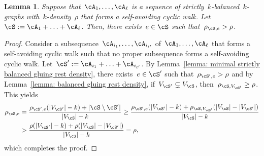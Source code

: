 \documentclass[11pt]{amsart}
\DeclarePairedDelimiter{\abs}{\lvert}{\rvert}
\newtheorem{lemma}[algocf]{Lemma}
\theoremstyle{definition}
\numberwithin{equation}{section}
\begin{document}
	\begin{lemma}\label{lemma: strictly balanced gluing rest density}
		Suppose that~$\cA_1,\ldots,\cA_\ell$ is a sequence of strictly~$k$-balanced~$k$-graphs with~$k$-density~$\rho$ that forms a self-avoiding cyclic walk.
		Let~$\cS:=\cA_1+\ldots+\cA_\ell$.
		Then, there exists~$e\in\cS$ such that~$\rho_{\cS,e}>\rho$.
	\end{lemma}
	\begin{proof}
		Consider a subsequence~$\cA_{i_1},\ldots,\cA_{i_{\ell'}}$ of~$\cA_1,\ldots,\cA_\ell$ that forms a self-avoiding cyclic walk such that no proper subsequence forms a self-avoiding cyclic walk.
		Let~$\cS':=\cA_{i_1}+\ldots+\cA_{i_{\ell'}}$.
		By Lemma~\ref{lemma: minimal strictly balanced gluing rest density}, there exists~$e\in\cS'$ such that~$\rho_{\cS',e}>\rho$ and by Lemma~\ref{lemma: balanced gluing rest density}, if~$V_{\cS'}\subsetneq V_\cS$, then~$\rho_{\cS,V_{\cS'}}\geq\rho$.
		This yields
		\begin{equation*}
			\begin{aligned}
				\rho_{\cS,e}
				&=\frac{ \rho_{\cS',e}(\abs{ V_{\cS'} }-k)+\abs{\cS\setminus\cS'} }{\abs{V_{\cS}}-k}
				\geq \frac{ \rho_{\cS',e}(\abs{ V_{\cS'} }-k)+\rho_{\cS,V_{\cS'}}( \abs{V_{\cS}}-\abs{V_{\cS'}} ) }{\abs{V_{\cS}}-k}\\
				&>\frac{ \rho(\abs{ V_{\cS'} }-k)+\rho( \abs{V_{\cS}}-\abs{V_{\cS'}} ) }{\abs{V_{\cS}}-k}
				=\rho,
			\end{aligned}
		\end{equation*}
		which completes the proof.
	\end{proof}
	
\end{document}
